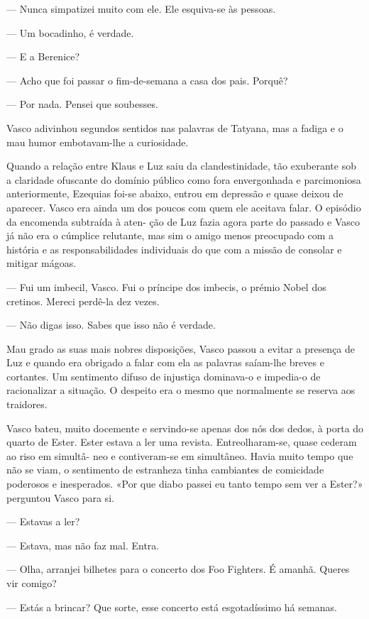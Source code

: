 --- Nunca simpatizei muito com ele. Ele esquiva-se às pessoas.

--- Um bocadinho, é verdade.

--- E a Berenice?

--- Acho que foi passar o fim-de-semana a casa dos pais.
Porquê?

--- Por nada. Pensei que soubesses.


Vasco adivinhou segundos sentidos nas palavras de Tatyana, mas a
fadiga e o mau humor embotavam-lhe a curiosidade.

Quando a relação entre
Klaus e Luz saiu da clandestinidade, tão exuberante sob a claridade
ofuscante do domínio público como fora envergonhada e parcimoniosa
anteriormente, Ezequias foi-se abaixo, entrou em depressão e quase
deixou de aparecer. Vasco era ainda um dos poucos com quem ele aceitava
falar. O episódio da encomenda subtraída à aten- ção de Luz fazia agora
parte do passado e Vasco já não era o cúmplice relutante, mas sim o
amigo menos preocupado com a história e as responsabilidades individuais
do que com a missão de consolar e mitigar mágoas.

--- Fui um imbecil, Vasco. Fui o príncipe dos imbecis, o prémio Nobel dos
  cretinos. Mereci perdê-la dez vezes.


--- Não digas isso. Sabes que isso não é verdade.


Mau grado as suas mais nobres disposições, Vasco passou a evitar a
presença de Luz e quando era obrigado a falar com ela as palavras
saíam-lhe breves e cortantes. Um sentimento difuso de injustiça
dominava-o e impedia-o de racionalizar a situação. O despeito era o
mesmo que normalmente se reserva aos traidores.

Vasco bateu, muito docemente e servindo-se apenas dos nós dos dedos, à
porta do quarto de Ester. Ester estava a ler uma revista.
Entreolharam-se, quase cederam ao riso em simultâ- neo e contiveram-se
em simultâneo. Havia muito tempo que não se viam, o sentimento de
estranheza tinha cambiantes de comicidade poderosos e inesperados. «Por
que diabo passei eu tanto tempo sem ver a Ester?» perguntou Vasco para
si.

--- Estavas a ler?

--- Estava, mas não faz mal. Entra.

--- Olha, arranjei bilhetes para o concerto dos Foo Fighters. É amanhã.
  Queres vir comigo?

--- Estás a brincar? Que sorte, esse concerto está esgotadíssimo há
  semanas.


